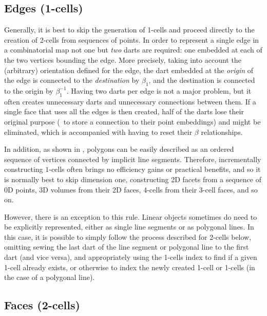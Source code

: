 \subsection{Edges (1-cells)}
\label{ss:incremental-edges}

Generally, it is best to skip the generation of 1-cells and proceed directly to the creation of 2-cells from sequences of points.
In order to represent a single edge in a combinatorial map not one but \emph{two} darts are required: one embedded at each of the two vertices bounding the edge.
More precisely, taking into account the (arbitrary) orientation defined for the edge, the dart embedded at the \emph{origin} of the edge is connected to the \emph{destination} by $\beta_1$, and the destination is connected to the origin by $\beta_1^{-1}$.
Having two darts per edge is not a major problem, but it often creates unnecessary darts and unnecessary connections between them.
If a single face that uses all the edges is then created, half of the darts lose their original purpose (\ie\ to store a connection to their point embeddings) and might be eliminated, which is accompanied with having to reset their $\beta$ relationships.

In addition, as shown in , polygons can be easily described as an ordered sequence of vertices connected by implicit line segments.
Therefore, incrementally constructing $1$-cells often brings no efficiency gains or practical benefits, and so it is normally best to skip dimension one, constructing 2D facets from a sequence of 0D points, 3D volumes from their 2D faces, 4-cells from their 3-cell faces, and so on.

However, there is an exception to this rule.
Linear objects sometimes do need to be explicitly represented, either as single line segments or as polygonal lines.
In this case, it is possible to simply follow the process described for 2-cells below, omitting sewing the last dart of the line segment or polygonal line to the first dart (and vice versa), and appropriately using the 1-cells index to find if a given 1-cell already exists, or otherwise to index the newly created 1-cell or 1-cells (in the case of a polygonal line).

\subsection{Faces (2-cells)}
\label{ss:incremental-faces}

